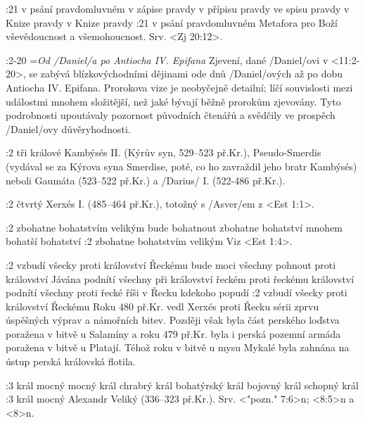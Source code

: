 :21  
    {v psání pravdomluvném}   %
    {v zápise pravdy}   %
    {v přípisu pravdy}   %
    {ve spisu pravdy}   %
    {v Knize pravdy}   %
    {v Knize pravdy}   %
:21 {v psání pravdomluvném}
Metafora pro Boží vševědoucnost a všemohoucnost. Srv. <Zj 20:12>.


:2-20 {}={\em Od \x/Daniel/a po Antiocha IV. Epifana} 
    Zjevení, dané \x/Daniel/ovi v <11:2-20>, se zabývá blízkovýchodními dějinami ode dnů \x/Daniel/ových až po dobu Antiocha IV. Epifana. Prorokova vize je neobyčejně detailní; líčí  souvislosti mezi událostmi mnohem složitější, než jaké bývají běžně prorokům zjevovány. Tyto podrobnosti upoutávaly pozornost původních čtenářů a svědčily ve prospěch \x/Daniel/ovy důvěryhodnosti.

:2 {tři králové} Kambýsés II. (Kýrův syn, 529--523 př.Kr.), Pseudo-Smerdis (vydával se za Kýrova syna Smerdise, poté, co ho zavraždil jeho bratr Kambýsés) neboli Gaumáta (523--522 př.Kr.) a \x/Darius/ I. (522-486 př.Kr.).

:2 {čtvrtý} Xerxés I. (485--464 př.Kr.), totožný s \x/Asver/em z <Est 1:1>.

:2
    {zbohatne bohatstvím velikým}   %
    {bude bohatnout}   %
    {zbohatne}   %
    {bohatství}   %
    {mnohem bohatší}   %
    {bohatství}   %
:2 {zbohatne bohatstvím velikým} Viz <Est 1:4>.

:2
    {vzbudí všecky proti království Řeckému}   %
    {bude moci všechny pohnout proti království Jávána}   %
    {podnítí všechny při království řeckém}   %
    {proti řeckému království}   %
    {podnítí všechny proti řecké říši}   %
    {v Řecku kdekoho popudí}   %
:2 {vzbudí všecky proti království Řeckému} Roku 480 př.Kr. vedl Xerxés proti Řecku sérii zprvu úspěšných výprav a námořních bitev. Později však byla část perského loďstva poražena v bitvě u Salamíny a roku 479 př.Kr. byla i perská pozemní armáda poražena v bitvě u Platají. Téhož roku  v bitvě u mysu Mykalé byla zahnána na ústup perská královská flotila.

:3  
    {král mocný}   %
    {mocný král}   %
    {chrabrý král}   %
    {bohatýrský král}   %
    {bojovný král}   %
    {schopný král}   %
:3 {král mocný} Alexandr Veliký (336--323 př.Kr.). Srv. <"pozn." 7:6>n; <8:5>n a  <8>n.  

